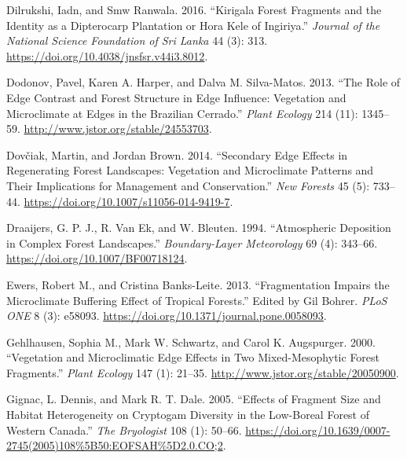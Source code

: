 \documentclass[
  12pt,
]{article}
\newlength{\cslhangindent}
\newenvironment{CSLReferences}[2] %
 {\begin{list}{}{%
  \setlength{\itemindent}{0pt}
  \setlength{\leftmargin}{0pt}
  \setlength{\parsep}{0pt}
  \ifodd #1
   \setlength{\leftmargin}{\cslhangindent}
   \setlength{\itemindent}{-1\cslhangindent}
  \fi
  \setlength{\itemsep}{#2\baselineskip}}}
 {\end{list}}
\begin{document}
\begin{CSLReferences}{1}{0}
Dilrukshi, Iadn, and Smw Ranwala. 2016. {``Kirigala Forest Fragments and
the Identity as a Dipterocarp Plantation or {Hora} {Kele} of
{Ingiriya}.''} \emph{Journal of the National Science Foundation of Sri
Lanka} 44 (3): 313. \url{https://doi.org/10.4038/jnsfsr.v44i3.8012}.

Dodonov, Pavel, Karen A. Harper, and Dalva M. Silva-Matos. 2013. {``The
Role of Edge Contrast and Forest Structure in Edge Influence: Vegetation
and Microclimate at Edges in the {Brazilian} Cerrado.''} \emph{Plant
Ecology} 214 (11): 1345--59. \url{http://www.jstor.org/stable/24553703}.

Dovčiak, Martin, and Jordan Brown. 2014. {``Secondary Edge Effects in
Regenerating Forest Landscapes: Vegetation and Microclimate Patterns and
Their Implications for Management and Conservation.''} \emph{New
Forests} 45 (5): 733--44.
\url{https://doi.org/10.1007/s11056-014-9419-7}.

Draaijers, G. P. J., R. Van Ek, and W. Bleuten. 1994. {``Atmospheric
Deposition in Complex Forest Landscapes.''} \emph{Boundary-Layer
Meteorology} 69 (4): 343--66. \url{https://doi.org/10.1007/BF00718124}.

Ewers, Robert M., and Cristina Banks-Leite. 2013. {``Fragmentation
{Impairs} the {Microclimate} {Buffering} {Effect} of {Tropical}
{Forests}.''} Edited by Gil Bohrer. \emph{PLoS ONE} 8 (3): e58093.
\url{https://doi.org/10.1371/journal.pone.0058093}.

Gehlhausen, Sophia M., Mark W. Schwartz, and Carol K. Augspurger. 2000.
{``Vegetation and {Microclimatic} {Edge} {Effects} in {Two}
{Mixed}-{Mesophytic} {Forest} {Fragments}.''} \emph{Plant Ecology} 147
(1): 21--35. \url{http://www.jstor.org/stable/20050900}.

Gignac, L. Dennis, and Mark R. T. Dale. 2005. {``Effects of {Fragment}
{Size} and {Habitat} {Heterogeneity} on {Cryptogam} {Diversity} in the
{Low}-Boreal {Forest} of {Western} {Canada}.''} \emph{The Bryologist}
108 (1): 50--66.
\url{https://doi.org/10.1639/0007-2745(2005)108\%5B50:EOFSAH\%5D2.0.CO;2}.


\end{CSLReferences}
\end{document}
